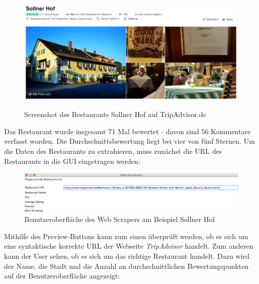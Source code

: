 \documentclass[a4paper,oneside,12pt]{report}
\begin{document}
		\begin{figure}[H]
			\centering
			\begin{minipage}[b]{1\textwidth}
				\includegraphics[width=\textwidth]{Bilder/ScreenshotSollnerHof.png}
			\end{minipage}
			\centering
			\caption[Screenshot des Restaurants Sollner Hof auf TripAdvisor.de]{Screenshot des Restaurants Sollner Hof auf TripAdvisor.de}
			\cite{bib-anzSterne}
			\label{pic-ScreenshotSollnerHof}
		\end{figure}
	
	Das Restaurant wurde insgesamt 71 Mal bewertet - davon sind 56 Kommentare verfasst worden. Die Durchschnittsbewertung liegt bei vier von fünf Sternen. 
	Um die Daten des Restaurants zu extrahieren, muss zunächst die URL des Restaurants in die GUI eingetragen werden:
	
	\begin{figure}[H]
		\centering
		\begin{minipage}[b]{1\textwidth}
			\includegraphics[width=\textwidth]{Bilder/GUISollnerHof.png}
		\end{minipage}
		\centering
		\caption[Benutzeroberfläche des Web Scrapers am Beispiel Sollner Hof]{Benutzeroberfläche des Web Scrapers am Beispiel Sollner Hof}
		\label{pic-URLSollnerHof}
	\end{figure}
	
	Mithilfe des Preview-Buttons kann zum einen überprüft werden, ob es sich um eine syntaktische korrekte URL der Webseite \textit{TripAdvisor} handelt. Zum anderen kann der User sehen, ob es sich um das richtige Restaurant handelt. Dazu wird der Name, die Stadt und die Anzahl an durchschnittlichen Bewertungspunkten auf der Benutzeroberfläche angezeigt:
	
\end{document}
